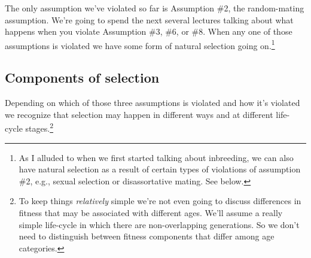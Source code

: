 The only assumption we've violated so far is Assumption \#2, the
random-mating assumption. We're going to spend the next several
lectures talking about what happens when you violate Assumption \#3,
\#6, or \#8. When any one of those assumptions is violated we have
some form of natural selection going on.\footnote{As I alluded to when
  we first started talking about inbreeding, we can also have natural
  selection as a result of certain types of violations of assumption
  \#2, e.g., sexual selection or disassortative mating. See
  below.}

\subsection*{Components of selection}

Depending on which of those three assumptions is violated and how it's
violated we recognize that selection may happen in different ways and
at different life-cycle stages.\footnote{To keep things {\it
    relatively\/} simple we're not even going to discuss differences
  in fitness that may be associated with different ages. We'll assume
  a really simple life-cycle in which there are non-overlapping
  generations. So we don't need to distinguish between fitness
  components that differ among age categories.}

